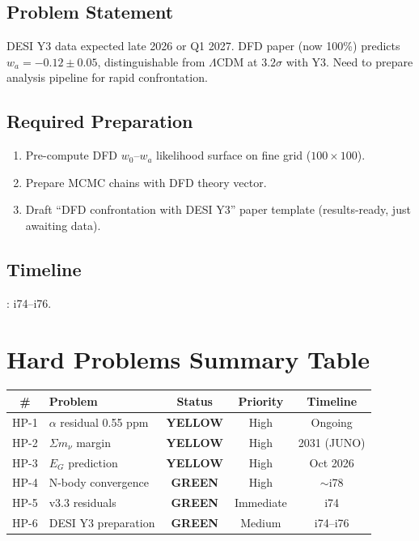 \documentclass[11pt,a4paper]{article}
\newcommand{\GREEN}{\textcolor{dfdgreen}{\textbf{GREEN}}}
\newcommand{\YELLOW}{\textcolor{dfdyellow}{\textbf{YELLOW}}}
\begin{document}
\subsection{Problem Statement}
DESI Y3 data expected late 2026 or Q1 2027. DFD paper (now 100\%) predicts $w_a = -0.12 \pm 0.05$, distinguishable from $\Lambda$CDM at $3.2\sigma$ with Y3. Need to prepare analysis pipeline for rapid confrontation.

\subsection{Required Preparation}
\begin{enumerate}[nosep]
\item Pre-compute DFD $w_0$--$w_a$ likelihood surface on fine grid ($100 \times 100$).
\item Prepare MCMC chains with DFD theory vector.
\item Draft ``DFD confrontation with DESI Y3'' paper template (results-ready, just awaiting data).
\end{enumerate}

\subsection{Timeline}: i74--i76.

\section{Hard Problems Summary Table}

\begin{center}
\begin{tabular}{clccc}
\toprule
\textbf{\#} & \textbf{Problem} & \textbf{Status} & \textbf{Priority} & \textbf{Timeline} \\
\midrule
HP-1 & $\alpha$ residual 0.55 ppm & \YELLOW & High & Ongoing \\
HP-2 & $\Sigma m_\nu$ margin & \YELLOW & High & 2031 (JUNO) \\
HP-3 & $E_G$ prediction & \YELLOW & High & Oct 2026 \\
HP-4 & N-body convergence & \GREEN & High & $\sim$i78 \\
HP-5 & v3.3 residuals & \GREEN & Immediate & i74 \\
HP-6 & DESI Y3 preparation & \GREEN & Medium & i74--i76 \\
\bottomrule
\end{tabular}
\end{center}
\end{document}
